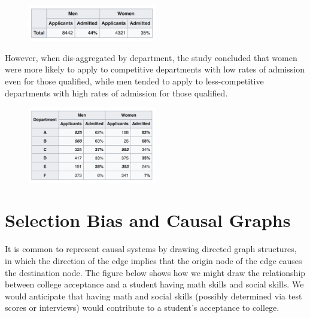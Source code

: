 \begin{figure}[ht]
  \begin{center}
    \includegraphics[width=0.5\textwidth]{figures/berk_1.png}
  \end{center}
\end{figure}

However, when dis-aggregated by department, the study concluded that women were more likely to apply to competitive departments with low rates of admission even for those qualified, while men tended to apply to less-competitive departments with high rates of admission for those qualified. 

\begin{figure}[ht]
  \begin{center}
    \includegraphics[width=0.5\textwidth]{figures/berk_2.png}
  \end{center}
\end{figure}


\section{Selection Bias and Causal Graphs}

It is common to represent causal systems by drawing directed graph structures, in which the direction of the edge implies that the origin node of the edge causes the destination node. The figure below shows how we might draw the relationship between college acceptance and a student having math skills and social skills. We would anticipate that having math and social skills (possibly determined via test scores or interviews) would contribute to a student's acceptance to college. 

